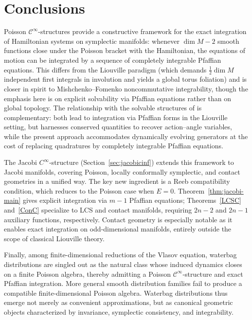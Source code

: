 \documentclass{article}
\theoremstyle{remark}
\theoremstyle{definition}
\begin{document}
\section{Conclusions}

Poisson $\mathcal C^\infty$-structures provide a constructive framework for the exact integration of Hamiltonian systems on symplectic manifolds: whenever $\dim M - 2$ smooth functions close under the Poisson bracket with the Hamiltonian, the equations of motion can be integrated by a sequence of completely integrable Pfaffian equations. This differs from the Liouville paradigm (which demands $\tfrac{1}{2}\dim M$ independent first integrals in involution and yields a global torus foliation) and is closer in spirit to Mishchenko--Fomenko noncommutative integrability, though the emphasis here is on explicit solvability via Pfaffian equations rather than on global topology. The relationship with the solvable structures of \cite{kresicjuric2025} is complementary: both lead to integration via Pfaffian forms in the Liouville setting, but \cite{kresicjuric2025} harnesses conserved quantities to recover action--angle variables, while the present approach accommodates dynamically evolving generators at the cost of replacing quadratures by completely integrable Pfaffian equations.

The Jacobi $C^\infty$-structure (Section~\ref{sec:jacobicinf}) extends this framework to Jacobi manifolds, covering Poisson, locally conformally symplectic, and contact geometries in a unified way. The key new ingredient is a Reeb compatibility condition, which reduces to the Poisson case when $E=0$. Theorem~\ref{thm:jacobi-main} gives explicit integration via $m-1$ Pfaffian equations; Theorems~\ref{LCSC} and~\ref{ConC} specialize to LCS and contact manifolds, requiring $2n-2$ and $2n-1$ auxiliary functions, respectively. Contact geometry is especially notable as it enables exact integration on odd-dimensional manifolds, entirely outside the scope of classical Liouville theory.

Finally, among finite-dimensional reductions of the Vlasov equation, waterbag distributions are singled out as the natural class whose induced dynamics closes on a finite Poisson algebra, thereby admitting a Poisson $\mathcal C^\infty$-structure and exact Pfaffian integration. More general smooth distribution families fail to produce a compatible finite-dimensional Poisson algebra. Waterbag distributions thus emerge not merely as convenient approximations, but as canonical geometric objects characterized by invariance, symplectic consistency, and integrability.


 
\end{document}
